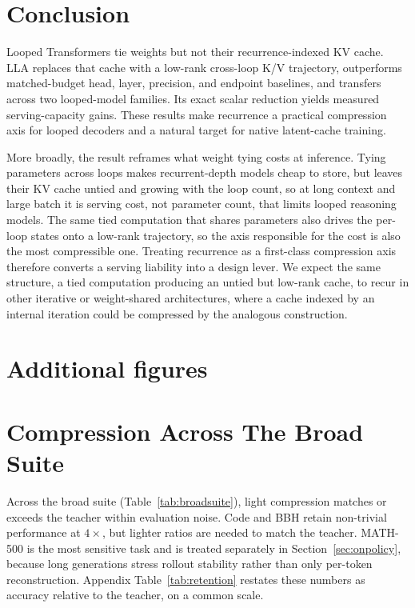 \documentclass[10pt]{article}
\newcommand{\lla}{LLA}
\begin{document}
\section{Conclusion}
\label{sec:conclusion}
Looped Transformers tie weights but not their recurrence-indexed KV cache. \lla{} replaces that cache with a low-rank cross-loop K/V trajectory, outperforms matched-budget head, layer, precision, and endpoint baselines, and transfers across two looped-model families. Its exact scalar reduction yields measured serving-capacity gains. These results make recurrence a practical compression axis for looped decoders and a natural target for native latent-cache training.

More broadly, the result reframes what weight tying costs at inference. Tying parameters across loops makes recurrent-depth models cheap to store, but leaves their KV cache untied and growing with the loop count, so at long context and large batch it is serving cost, not parameter count, that limits looped reasoning models. The same tied computation that shares parameters also drives the per-loop states onto a low-rank trajectory, so the axis responsible for the cost is also the most compressible one. Treating recurrence as a first-class compression axis therefore converts a serving liability into a design lever. We expect the same structure, a tied computation producing an untied but low-rank cache, to recur in other iterative or weight-shared architectures, where a cache indexed by an internal iteration could be compressed by the analogous construction.

\clearpage


\appendix
\AppendixExpDetails
\section{Additional figures}
\label{app:extrafigs}
\FigureParetoTwoSix
\FigureCapacity

\section{Compression Across The Broad Suite}
\label{app:broadsuite}
\TableBroadSuite
Across the broad suite (Table~\ref{tab:broadsuite}), light compression matches or exceeds the teacher within evaluation noise. Code and BBH retain non-trivial performance at $4\times$, but lighter ratios are needed to match the teacher. MATH-500 is the most sensitive task and is treated separately in Section~\ref{sec:onpolicy}, because long generations stress rollout stability rather than only per-token reconstruction. Appendix Table~\ref{tab:retention} restates these numbers as accuracy relative to the teacher, on a common scale.
\end{document}
